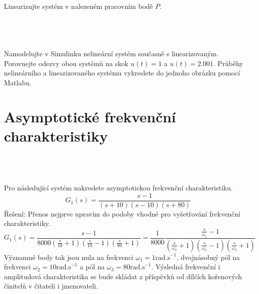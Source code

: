 \documentclass[twoside]{article}
\begin{document}
\subsection{~}
Linearizujte systém v nalezeném pracovním bodě $P$.

\subsection{~}
Namodelujte v Simulinku nelineární systém současně s linearizovaným. Porovnejte odezvy obou systémů
na skok $u(t) = 1$ a $u(t) = 2.001$. Průběhy nelineárního a linearizovaného systému vykreslete do jednoho
obrázku pomocí Matlabu.

\section{Asymptotické frekvenční charakteristiky}
\label{sec:ukol4}

\subsection{~}
Pro následující systém nakreslete asymptotickou frekvenční charakteristiku.
\begin{equation}
	G_1(s) = \frac{s-1}{(s+10)(s-10)(s+80)}
\end{equation}
Řešení: Přenos nejprve upravím do podoby vhodné pro vyšetřování frekvenční charakteristiky.
\begin{equation*}
	G_1(s) = \frac{s-1}{8000(\frac{s}{10}+1)(\frac{s}{10}-1)(\frac{s}{80}+1)} = \frac{1}{8000} \frac{\frac{s}{\omega_1}-1}{(\frac{s}{\omega_2}+1)(\frac{s}{\omega_2}-1)(\frac{s}{\omega_3}+1)}
\end{equation*}
Významné body tak jsou nula na frekvenci $\omega_1 = 1 \text{rad.s}^{-1}$, dvojnásobný pól na frekvenci $\omega_2 = 10 \text{rad.s}^{-1}$ a pól na $\omega_3 = 80 \text{rad.s}^{-1}$.
Výsledná frekvenční i amplitudová charakteristika se bude skládat z příspěvků od dílčích kořenových činitelů v čitateli i jmenovateli.
\end{document}
